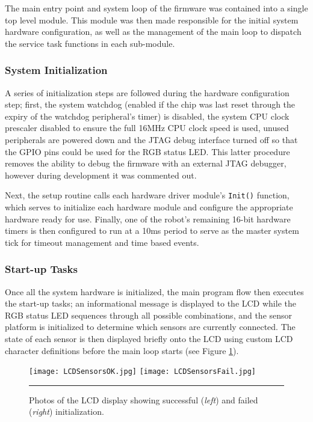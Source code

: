 The main entry point and system loop of the firmware was contained into a single top level module. This module was then made responsible for the initial system hardware configuration, as well as the management of the main loop to dispatch the service task functions in each sub-module.

\FloatBarrier
\subsubsection{System Initialization}

A series of initialization steps are followed during the hardware configuration step; first, the system watchdog (enabled if the chip was last reset through the expiry of the watchdog peripheral's timer) is disabled, the system CPU clock prescaler disabled to ensure the full 16MHz CPU clock speed is used, unused peripherals are powered down and the JTAG debug interface turned off so that the GPIO pins could be used for the RGB status LED. This latter procedure removes the ability to debug the firmware with an external JTAG debugger, however during development it was commented out.

Next, the setup routine calls each hardware driver module's \lstinline{Init()} function, which serves to initialize each hardware module and configure the appropriate hardware ready for use. Finally, one of the robot's remaining 16-bit hardware timers is then configured to run at a 10ms period to serve as the master system tick for timeout management and time based events.

\FloatBarrier
\subsubsection{Start-up Tasks}

Once all the system hardware is initialized, the main program flow then executes the start-up tasks; an informational message is displayed to the LCD while the RGB status LED sequences through all possible combinations, and the sensor platform is initialized to determine which sensors are currently connected. The state of each sensor is then displayed briefly onto the LCD using custom LCD character definitions before the main loop starts (see Figure \ref{fig:sensorinitlcd}).

\begin{figure}[tbph]
	\vspace{1em}
	\centering
		\texttt{[image: LCDSensorsOK.jpg]}
		\texttt{[image: LCDSensorsFail.jpg]}
	\rule{35em}{0.5pt}
	\caption[LCD Sensor Status Information]{Photos of the LCD display showing successful (\textit{left}) and failed (\textit{right}) initialization.}
	\label{fig:sensorinitlcd}
\end{figure}

